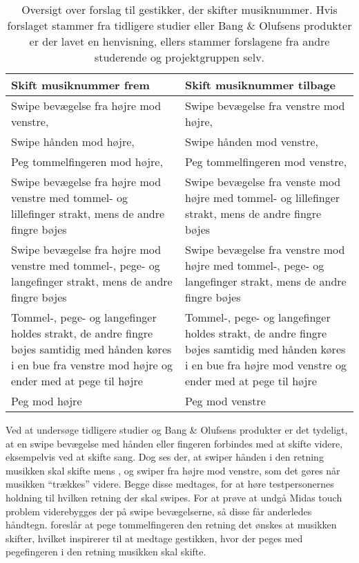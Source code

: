 %
\begin{table}[H]
	\centering
	\begin{tabular}{| p{6cm} | p{6cm} |}
		\hline
		\textbf{Skift musiknummer frem} & \textbf{Skift musiknummer tilbage} \\ \hline
		Swipe bevægelse fra højre mod venstre, \parencite[s. 48]{WEB:Beosound2, WEB:BeosoundMoment, PDF:UserDefinedGesturesTV} & Swipe bevægelse fra venstre mod højre, \parencite[s. 48]{WEB:Beosound2, WEB:BeosoundMoment, PDF:UserDefinedGesturesTV} \\ \hline
		Swipe hånden mod højre, \parencite[s. 166]{PDF:ComparingInputModalities}  & Swipe hånden mod venstre, \parencite[s. 166]{PDF:ComparingInputModalities}  \\ \hline
		Peg tommelfingeren mod højre, \parencite[s. 166]{PDF:ComparingInputModalities} & Peg tommelfingeren mod venstre, \parencite[s. 166]{PDF:ComparingInputModalities} \\ \hline
		Swipe bevægelse fra højre mod venstre med tommel- og lillefinger strakt, mens de andre fingre bøjes & Swipe bevægelse fra venste mod højre med tommel- og lillefinger strakt, mens de andre fingre bøjes \\ \hline
		Swipe bevægelse fra højre mod venstre med tommel-, pege- og langefinger strakt, mens de andre fingre bøjes & Swipe bevægelse fra venstre mod højre med tommel-, pege- og langefinger strakt, mens de andre fingre bøjes \\ \hline
		Tommel-, pege- og langefinger holdes strakt, de andre fingre bøjes samtidig med hånden køres i en bue fra venstre mod højre og ender med at pege til højre & Tommel-, pege- og langefinger holdes strakt, de andre fingre bøjes samtidig med hånden køres i en bue fra højre mod venstre og ender med at pege til højre\\ \hline
		Peg mod højre & Peg mod venstre\\ \hline
	\end{tabular}
	\caption{Oversigt over forslag til gestikker, der skifter musiknummer. Hvis forslaget stammer fra tidligere studier eller Bang $\&$ Olufsens produkter er der lavet en henvisning, ellers stammer forslagene fra andre studerende og projektgruppen selv.}
	\label{tab:IndsamledeGestikkerSkift}
\end{table}
\noindent
%
Ved at undersøge tidligere studier og Bang $\&$ Olufsens produkter er det tydeligt, at en swipe bevægelse med hånden eller fingeren forbindes med at skifte videre, eksempelvis ved at skifte sang. Dog ses der, at \textcite[s. 166]{PDF:ComparingInputModalities} swiper hånden i den retning musikken skal skifte mens \textcite[s. 48]{PDF:UserDefinedGesturesTV}, \textcite{WEB:Beosound2} og \textcite{WEB:BeosoundMoment} swiper fra højre mod venstre, som det gøres når musikken \enquote{trækkes} videre. Begge disse medtages, for at høre testpersonernes holdning til hvilken retning der skal swipes. For at prøve at undgå Midas touch problem viderebygges der på swipe bevægelserne, så disse får anderledes håndtegn. \textcite[s. 166]{PDF:ComparingInputModalities} foreslår at pege tommelfingeren den retning det ønskes at musikken skifter, hvilket inspirerer til at medtage gestikken, hvor der peges med pegefingeren i den retning musikken skal skifte. 
